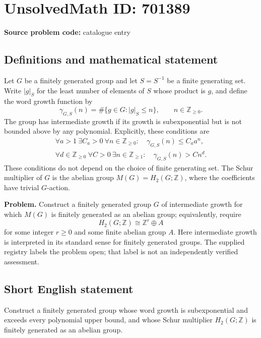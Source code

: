 \documentclass[11pt]{article}
\newcommand{\Z}{\mathbb{Z}}
\begin{document}
\section*{UnsolvedMath ID: 701389}
\textbf{Source problem code:} catalogue entry
\subsection{Definitions and mathematical statement}
Let \(G\) be a finitely generated group and let \(S=S^{-1}\) be a finite generating set. Write \(\lvert g\rvert_S\) for the least number of elements of \(S\) whose product is \(g\), and define the word growth function by
\[
\gamma_{G,S}(n)=\#\{g\in G:\lvert g\rvert_S\le n\},\qquad n\in\Z_{\ge0}.
\]
The group has intermediate growth if its growth is subexponential but is not bounded above by any polynomial. Explicitly, these conditions are
\[
\begin{gathered}
\forall a>1\ \exists C_a>0\ \forall n\in\Z_{\ge0}:\quad \gamma_{G,S}(n)\le C_a a^n,\\
\forall d\in\Z_{\ge0}\ \forall C>0\ \exists n\in\Z_{\ge1}:\quad \gamma_{G,S}(n)>Cn^d.
\end{gathered}
\]
These conditions do not depend on the choice of finite generating set. The Schur multiplier of \(G\) is the abelian group \(M(G)=H_2(G;\Z)\), where the coefficients have trivial \(G\)-action.

\textbf{Problem.} Construct a finitely generated group \(G\) of intermediate growth for which \(M(G)\) is finitely generated as an abelian group; equivalently, require
\[
H_2(G;\Z)\cong\Z^r\oplus A
\]
for some integer \(r\ge0\) and some finite abelian group \(A\). Here intermediate growth is interpreted in its standard sense for finitely generated groups. The supplied registry labels the problem open; that label is not an independently verified assessment.
\subsection{Short English statement}
Construct a finitely generated group whose word growth is subexponential and exceeds every polynomial upper bound, and whose Schur multiplier \(H_2(G;\Z)\) is finitely generated as an abelian group.
\end{document}
